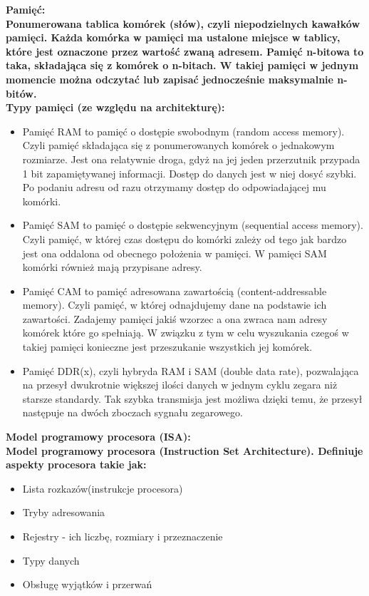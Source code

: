 \documentclass[a4paper,12pt]{article}
\newcommand{\h}[1]{\noindent \bf #1 \rm \\ \noindent}
\begin{document}
\h{Pamięć:}
Ponumerowana tablica komórek (słów), czyli niepodzielnych kawałków pamięci. Każda komórka w pamięci ma ustalone miejsce w tablicy, które jest oznaczone przez wartość zwaną adresem. Pamięć n-bitowa to taka, składająca się z komórek o n-bitach. W takiej pamięci w jednym momencie można odczytać lub zapisać jednocześnie maksymalnie n-bitów.\\

\h{Typy pamięci (ze względu na architekturę):}
\begin{itemize}
	\item Pamięć RAM to pamięć o dostępie swobodnym (random access memory). Czyli pamięć składająca się z ponumerowanych komórek o jednakowym rozmiarze.  Jest ona relatywnie droga, gdyż na jej jeden przerzutnik przypada 1 bit zapamiętywanej informacji. Dostęp do danych jest w niej dosyć szybki. Po podaniu adresu od razu otrzymamy dostęp do odpowiadającej mu komórki.
	
	\item Pamięć SAM to pamięć o dostępie sekwencyjnym (sequential access memory). Czyli pamięć, w której czas dostępu do komórki zależy od tego jak bardzo jest ona oddalona od obecnego położenia w pamięci. W pamięci SAM komórki również mają przypisane adresy.
	
	\item Pamięć CAM to pamięć adresowana zawartością (content-addressable memory). Czyli pamięć, w której odnajdujemy dane na podstawie ich zawartości. Zadajemy pamięci jakiś wzorzec a ona zwraca nam adresy komórek które go spełniają. W związku z tym w celu wyszukania czegoś w takiej pamięci konieczne jest przeszukanie wszystkich jej komórek.
	
	\item Pamięć DDR(x), czyli hybryda RAM i SAM (double data rate), pozwalająca na przesył dwukrotnie większej ilości danych w jednym cyklu zegara niż starsze standardy. Tak szybka transmisja jest możliwa dzięki temu, że przesył następuje na dwóch zboczach sygnału zegarowego.
\end{itemize}

\h{Model programowy procesora (ISA):}
Model programowy procesora (Instruction Set Architecture). Definiuje aspekty procesora takie jak:
\begin{itemize}
	\item Lista rozkazów(instrukcje procesora)
	\item Tryby adresowania
	\item Rejestry - ich liczbę, rozmiary i przeznaczenie
	\item Typy danych
	\item Obsługę wyjątków i przerwań
\end{itemize}
\end{document}

